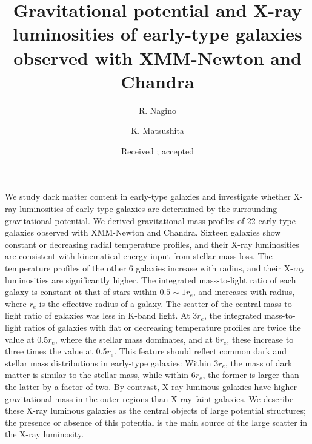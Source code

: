 \documentclass[structabstract]{aa}
\begin{document}
   \title{Gravitational potential and X-ray luminosities of 
   early-type galaxies observed with XMM-Newton and Chandra}

   \subtitle{}

   \author{R. Nagino
          \and
          K. Matsushita
          }



   \date{Received ; accepted }

  \abstract
   {}
   {We study dark matter content in early-type galaxies and
   investigate whether X-ray luminosities of early-type galaxies are
   determined by the surrounding gravitational potential.}
   {We derived gravitational mass profiles of 22 early-type galaxies
   observed with XMM-Newton and Chandra.}
   {Sixteen galaxies show constant or
   decreasing radial temperature profiles, and their X-ray luminosities
   are consistent with kinematical energy input from stellar mass
   loss. The temperature profiles of the other 6 galaxies increase with
   radius, and their X-ray luminosities are significantly higher.
   The integrated mass-to-light ratio of each galaxy is constant at
   that of stars within $0.5\sim 1 r_e$, and increases with radius, where
   $r_e$ is the effective radius of a galaxy. The scatter of the central
   mass-to-light ratio of galaxies was less in K-band light. At 3$r_e$, the
   integrated mass-to-light ratios of galaxies with flat or decreasing
   temperature profiles are twice the value at 0.5$r_e$, where the stellar
   mass dominates, and at 6$r_e$, these increase to three times the value
   at 0.5$r_e$.}
   {This feature should reflect common dark and stellar mass distributions
   in early-type galaxies: Within 3$r_e$, the mass of dark matter is similar
   to the stellar mass, while within 6$r_e$, the former is larger than the
   latter by a factor of two. By contrast, X-ray luminous galaxies have
   higher gravitational mass in the outer regions than X-ray faint
   galaxies. We describe these X-ray luminous galaxies as the central
   objects of large potential structures; the presence or absence of this
   potential is the main source of the large scatter in the X-ray
   luminosity.}
\end{document}
